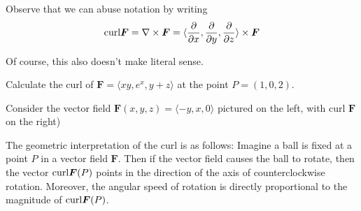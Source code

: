 Observe that we can abuse notation by writing $$\textnormal{curl} \bm{F} = \nabla \times \bm{F} = \langle\frac{\partial}{\partial x}, \frac{\partial}{\partial y}, \frac{\partial}{\partial z}  \rangle \times \bm{F} $$
    
    Of course, this also doesn't make literal sense. 

\begin{example}
    Calculate the curl of $\bm{F} = \langle xy, e^x,y+z \rangle$  at the point $P = (1,0,2)$.
\end{example}





\begin{example}
    
    Consider the vector field $\bm{F}(x,y,z) = \langle -y, x, 0 \rangle$ pictured on the left, with curl $\bm{F}$ on the right)
    
    \begin{center}
    \end{center}
    \end{example}

The geometric interpretation of the curl is as follows:  Imagine a ball is fixed at a point $P$ in a vector field $\bm{F}$.  Then if the vector field causes the ball to rotate, then the vector $\textnormal{curl}\bm{F}(P)$ points in the direction of the axis of counterclockwise rotation.   
    Moreover, the angular speed of rotation is directly proportional to the magnitude of $\textnormal{curl}\bm{F}(P)$.







